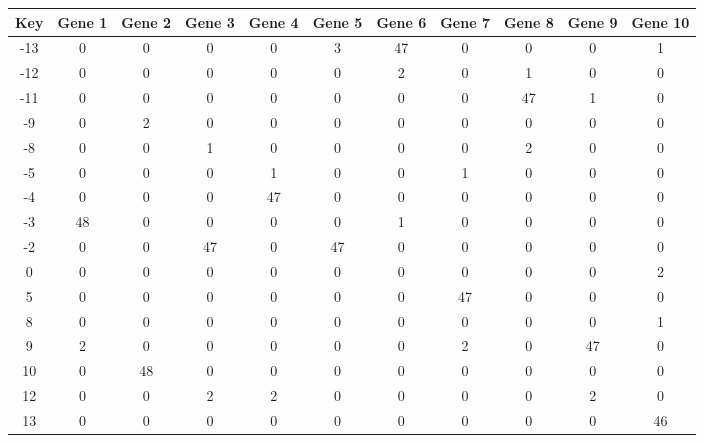 \begin{tabular}{|c|c|c|c|c|c|c|c|c|c|c|}
\hline
Key & Gene 1 & Gene 2 & Gene 3 & Gene 4 & Gene 5 & Gene 6 & Gene 7 & Gene 8 & Gene 9 & Gene 10 \\
\hline
-13 & 0 & 0 & 0 & 0 & 3 & 47 & 0 & 0 & 0 & 1 \\
-12 & 0 & 0 & 0 & 0 & 0 & 2 & 0 & 1 & 0 & 0 \\
-11 & 0 & 0 & 0 & 0 & 0 & 0 & 0 & 47 & 1 & 0 \\
-9 & 0 & 2 & 0 & 0 & 0 & 0 & 0 & 0 & 0 & 0 \\
-8 & 0 & 0 & 1 & 0 & 0 & 0 & 0 & 2 & 0 & 0 \\
-5 & 0 & 0 & 0 & 1 & 0 & 0 & 1 & 0 & 0 & 0 \\
-4 & 0 & 0 & 0 & 47 & 0 & 0 & 0 & 0 & 0 & 0 \\
-3 & 48 & 0 & 0 & 0 & 0 & 1 & 0 & 0 & 0 & 0 \\
-2 & 0 & 0 & 47 & 0 & 47 & 0 & 0 & 0 & 0 & 0 \\
0 & 0 & 0 & 0 & 0 & 0 & 0 & 0 & 0 & 0 & 2 \\
5 & 0 & 0 & 0 & 0 & 0 & 0 & 47 & 0 & 0 & 0 \\
8 & 0 & 0 & 0 & 0 & 0 & 0 & 0 & 0 & 0 & 1 \\
9 & 2 & 0 & 0 & 0 & 0 & 0 & 2 & 0 & 47 & 0 \\
10 & 0 & 48 & 0 & 0 & 0 & 0 & 0 & 0 & 0 & 0 \\
12 & 0 & 0 & 2 & 2 & 0 & 0 & 0 & 0 & 2 & 0 \\
13 & 0 & 0 & 0 & 0 & 0 & 0 & 0 & 0 & 0 & 46 \\
\hline
\end{tabular}